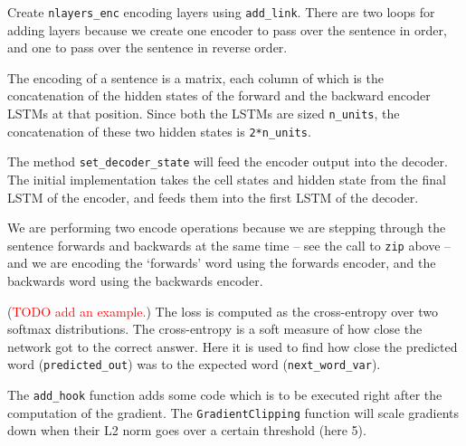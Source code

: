 \documentclass[answers]{exam}
\begin{document}
\begin{questions}

\begin{framed}
\begin{compactenum}[A.]
	\item
    Create \texttt{nlayers\_enc} encoding layers using \texttt{add\_link}. There
    are two loops for adding layers because we create one encoder to pass over
    the sentence in order, and one to pass over the sentence in reverse order. 
  \item
    The encoding of a sentence is a matrix, each column of which is the
    concatenation of the hidden states of the forward and the backward encoder
    LSTMs at that position. Since both the LSTMs are sized \texttt{n\_units},
    the concatenation of these two hidden states is \texttt{2*n\_units}. 
  \item
    The method \texttt{set\_decoder\_state} will feed the encoder output into
    the decoder. The initial implementation takes the cell states and hidden
    state from the final LSTM of the encoder, and feeds them into the first LSTM
    of the decoder.  
  \item
    We are performing two encode operations because we are stepping through the
    sentence forwards and backwards at the same time -- see the call to
    \texttt{zip} above -- and we are encoding the `forwards' word using the
    forwards encoder, and the backwards word using the backwards encoder.  
  \item
    (\textcolor{red}{TODO add an example.})
    The loss is computed as the cross-entropy over two softmax distributions.
    The cross-entropy is a soft measure of how close the network got to the
    correct answer. Here it is used to find how close the predicted word
    (\texttt{predicted\_out}) was to the expected word
    (\texttt{next\_word\_var}).  
  \item
    The \texttt{add\_hook} function adds some code which is to be executed right
    after the computation of the gradient. The \texttt{GradientClipping}
    function will scale gradients down when their L2 norm goes over a certain
    threshold (here 5). 
\end{compactenum}
\end{framed}



\end{questions}
\end{document}
